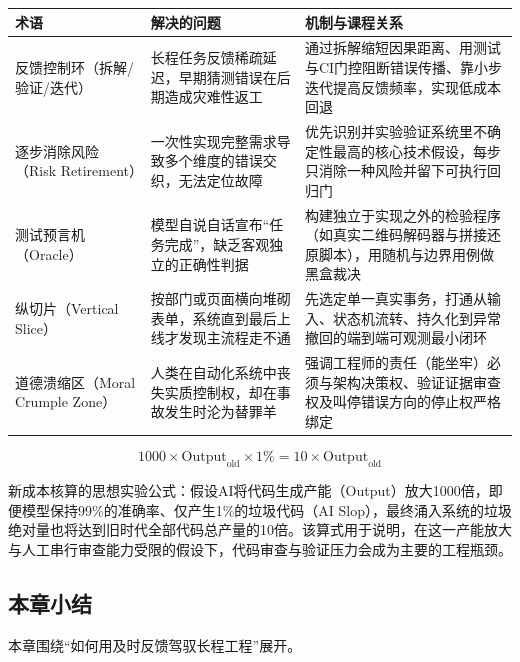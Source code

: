 \documentclass[UTF8,a4paper,11pt,fontset=fandol]{ctexart}
\begin{document}
\begin{center}\small\begin{tabularx}{\linewidth}{YYY}

\toprule

术语 & 解决的问题 & 机制与课程关系\\\midrule

反馈控制环（拆解/验证/迭代） & 长程任务反馈稀疏延迟，早期猜测错误在后期造成灾难性返工 & 通过拆解缩短因果距离、用测试与CI门控阻断错误传播、靠小步迭代提高反馈频率，实现低成本回退\\[3pt]

逐步消除风险（Risk Retirement） & 一次性实现完整需求导致多个维度的错误交织，无法定位故障 & 优先识别并实验验证系统里不确定性最高的核心技术假设，每步只消除一种风险并留下可执行回归门\\[3pt]

测试预言机（Oracle） & 模型自说自话宣布“任务完成”，缺乏客观独立的正确性判据 & 构建独立于实现之外的检验程序（如真实二维码解码器与拼接还原脚本），用随机与边界用例做黑盒裁决\\[3pt]

纵切片（Vertical Slice） & 按部门或页面横向堆砌表单，系统直到最后上线才发现主流程走不通 & 先选定单一真实事务，打通从输入、状态机流转、持久化到异常撤回的端到端可观测最小闭环\\[3pt]

道德溃缩区（Moral Crumple Zone） & 人类在自动化系统中丧失实质控制权，却在事故发生时沦为替罪羊 & 强调工程师的责任（能坐牢）必须与架构决策权、验证证据审查权及叫停错误方向的停止权严格绑定\\[3pt]

\bottomrule\end{tabularx}\end{center}

\[
1000 \times \text{Output}_{\text{old}} \times 1\% = 10 \times \text{Output}_{\text{old}}
\]

新成本核算的思想实验公式：假设AI将代码生成产能（Output）放大1000倍，即便模型保持99\%的准确率、仅产生1\%的垃圾代码（AI Slop），最终涌入系统的垃圾绝对量也将达到旧时代全部代码总产量的10倍。该算式用于说明，在这一产能放大与人工串行审查能力受限的假设下，代码审查与验证压力会成为主要的工程瓶颈。

\subsection{本章小结}

本章围绕“如何用及时反馈驾驭长程工程”展开。
\end{document}

